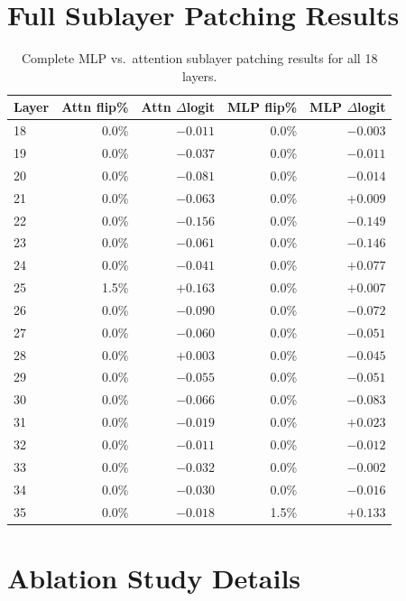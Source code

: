 \documentclass{article}
\begin{document}
\section{Full Sublayer Patching Results}
\label{app:sublayer}

\begin{table}[h]
\centering
\small
\caption{Complete MLP vs.\ attention sublayer patching results for all 18 layers.}
\label{tab:full_sublayer}
\begin{tabular}{lrrrr}
\toprule
\textbf{Layer} & \textbf{Attn flip\%} & \textbf{Attn $\Delta$logit} & \textbf{MLP flip\%} & \textbf{MLP $\Delta$logit} \\
\midrule
18 & 0.0\% & $-0.011$ & 0.0\% & $-0.003$ \\
19 & 0.0\% & $-0.037$ & 0.0\% & $-0.011$ \\
20 & 0.0\% & $-0.081$ & 0.0\% & $-0.014$ \\
21 & 0.0\% & $-0.063$ & 0.0\% & $+0.009$ \\
22 & 0.0\% & $-0.156$ & 0.0\% & $-0.149$ \\
23 & 0.0\% & $-0.061$ & 0.0\% & $-0.146$ \\
24 & 0.0\% & $-0.041$ & 0.0\% & $+0.077$ \\
25 & 1.5\% & $+0.163$ & 0.0\% & $+0.007$ \\
26 & 0.0\% & $-0.090$ & 0.0\% & $-0.072$ \\
27 & 0.0\% & $-0.060$ & 0.0\% & $-0.051$ \\
28 & 0.0\% & $+0.003$ & 0.0\% & $-0.045$ \\
29 & 0.0\% & $-0.055$ & 0.0\% & $-0.051$ \\
30 & 0.0\% & $-0.066$ & 0.0\% & $-0.083$ \\
31 & 0.0\% & $-0.019$ & 0.0\% & $+0.023$ \\
32 & 0.0\% & $-0.011$ & 0.0\% & $-0.012$ \\
33 & 0.0\% & $-0.032$ & 0.0\% & $-0.002$ \\
34 & 0.0\% & $-0.030$ & 0.0\% & $-0.016$ \\
35 & 0.0\% & $-0.018$ & 1.5\% & $+0.133$ \\
\bottomrule
\end{tabular}
\end{table}

\section{Ablation Study Details}
\label{app:ablation}
\end{document}
